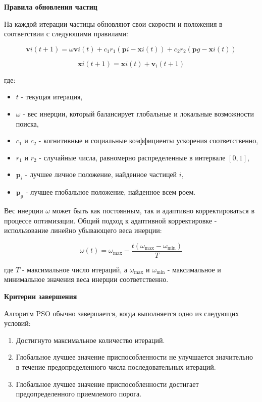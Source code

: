 \textbf{Правила обновления частиц}

На каждой итерации частицы обновляют свои скорости и положения в
соответствии с следующими правилами:

\begin{equation*}
    \mathbf{v}{i}(t+1) = \omega \mathbf{v}{i}(t)
    + c_1 r_1 (\mathbf{p}{i} - \mathbf{x}{i}(t))
    + c_2 r_2 (\mathbf{p}{g} - \mathbf{x}{i}(t))
\end{equation*}

\begin{equation*}
    \mathbf{x}{i}(t+1) = \mathbf{x}{i}(t) + \mathbf{v}_{i}(t+1)
\end{equation*}

где:
\begin{itemize}
    \item $t$ - текущая итерация,
    \item $\omega$ - вес инерции, который балансирует глобальные и локальные возможности поиска,
    \item $c_1$ и $c_2$ - когнитивные и социальные коэффициенты ускорения соответственно,
    \item $r_1$ и $r_2$ - случайные числа, равномерно распределенные в интервале $[0, 1]$,
    \item $\mathbf{p}_i$ - лучшее личное положение, найденное частицей $i$,
    \item $\mathbf{p}_g$ - лучшее глобальное положение, найденное всем роем.
\end{itemize}

Вес инерции $\omega$ может быть как постоянным, так и
адаптивно корректироваться в процессе оптимизации.
Общий подход к адаптивной корректировке - использование
линейно убывающего веса инерции:

\begin{equation*}
    \omega(t) = \omega_{\max} - \frac{t(\omega_{\max}
        - \omega_{\min})}{T}
\end{equation*}

где $T$ - максимальное число итераций, а $\omega_{\max}$
и $\omega_{\min}$ - максимальное и
минимальное значения веса инерции соответственно.

\textbf{Критерии завершения}

Алгоритм PSO обычно завершается, когда выполняется одно из следующих условий:

\begin{enumerate}
    \item Достигнуто максимальное количество итераций.
    \item Глобальное лучшее значение приспособленности не улучшается
    значительно в течение предопределенного числа последовательных итераций.
    \item Глобальное лучшее значение приспособленности
    достигает предопределенного приемлемого порога.
\end{enumerate}


